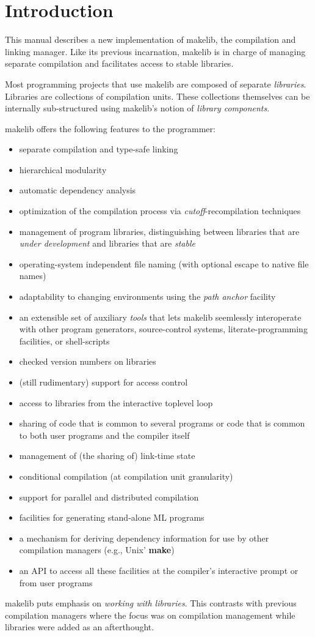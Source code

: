 
\section{Introduction}

This manual describes a new implementation of makelib, the
compilation and linking manager.  Like
its previous incarnation, makelib is in charge of managing separate
compilation and facilitates access to stable libraries.

Most programming projects that use makelib are composed of separate {\em
libraries}.  Libraries are collections of compilation units.  These
collections themselves can be internally sub-structured using makelib's
notion of {\em library components}.

makelib offers the following features to the programmer:

\begin{itemize}
\item separate compilation and type-safe linking~\cite{appel94:sepcomp}
\item hierarchical modularity~\cite{blume:appel:cm99}
\item automatic dependency analysis~\cite{blume:depend99}
\item optimization of the compilation process via {\em
cutoff}-recompilation techniques~\cite{tichy94}
\item management of program libraries, distinguishing between libraries
that are {\em under development} and libraries that are {\em stable}
\item operating-system independent file naming (with optional escape
to native file names)
\item adaptability to changing environments using the {\em path anchor}
facility
\item an extensible set of auxiliary {\em tools} that lets makelib
seemlessly interoperate with other program generators, source-control
systems, literate-programming facilities, or shell-scripts
\item checked version numbers on libraries
\item (still rudimentary) support for access control
\item access to libraries from the interactive toplevel loop
\item sharing of code that is common to several programs or code that
is common to both user programs and the compiler itself
\item management of (the sharing of) link-time state
\item conditional compilation (at compilation unit granularity)
\item support for parallel and distributed compilation
\item facilities for generating stand-alone ML programs
\item a mechanism for deriving dependency information for use
by other compilation managers (e.g., Unix' {\bf make})
\item an API to access all these facilities at the compiler's interactive
prompt or from user programs
\end{itemize}

makelib puts emphasis on {\em working with libraries}.  This contrasts with
previous compilation managers where the focus was on
compilation management while libraries were added as an afterthought.

